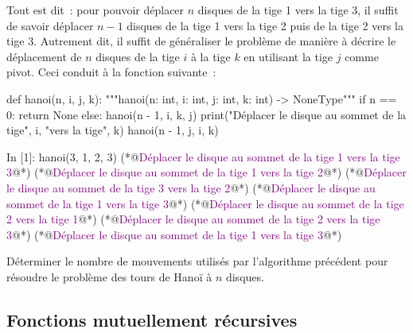 \documentclass{magnoliaold}
\begin{document}
Tout est dit~: pour pouvoir déplacer $n$ disques de la tige 1 vers la tige 3, il suffit de
savoir déplacer $n-1$ disques de la tige 1 vers la tige 2 puis de la tige 2 vers la tige 3.
Autrement dit, il suffit de généraliser le problème de manière à décrire le déplacement
de $n$ disques de la tige $i$ à la tige $k$ en utilisant la tige $j$ comme pivot. Ceci
conduit à la fonction suivante~:
\begin{pythoncodeline}
def hanoi(n, i, j, k):
    """hanoi(n: int, i: int, j: int, k: int) -> NoneType"""
    if n == 0:
        return None
    else:
        hanoi(n - 1, i, k, j)
        print("Déplacer le disque au sommet de la tige", i, "vers la tige", k)
        hanoi(n - 1, j, i, k)
\end{pythoncodeline}
\begin{pythoncode}
In [1]: hanoi(3, 1, 2, 3)
(*@\textcolor{purple}{Déplacer le disque au sommet de la tige 1 vers la tige 3}@*)
(*@\textcolor{purple}{Déplacer le disque au sommet de la tige 1 vers la tige 2}@*)
(*@\textcolor{purple}{Déplacer le disque au sommet de la tige 3 vers la tige 2}@*)
(*@\textcolor{purple}{Déplacer le disque au sommet de la tige 1 vers la tige 3}@*)
(*@\textcolor{purple}{Déplacer le disque au sommet de la tige 2 vers la tige 1}@*)
(*@\textcolor{purple}{Déplacer le disque au sommet de la tige 2 vers la tige 3}@*)
(*@\textcolor{purple}{Déplacer le disque au sommet de la tige 1 vers la tige 3}@*)
\end{pythoncode}


\begin{exoUnique}
\exo Déterminer le nombre de mouvements utilisés par l'algorithme précédent
  pour résoudre le problème des tours de Hanoï à $n$ disques.
\end{exoUnique}


\subsection{Fonctions mutuellement récursives}
\end{document}
